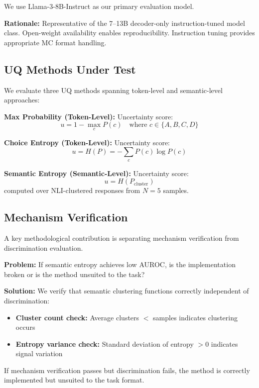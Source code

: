 We use Llama-3-8B-Instruct as our primary evaluation model.

\textbf{Rationale:} Representative of the 7--13B decoder-only instruction-tuned model class. Open-weight availability enables reproducibility. Instruction tuning provides appropriate MC format handling.

\subsection{UQ Methods Under Test}

We evaluate three UQ methods spanning token-level and semantic-level approaches:

\textbf{Max Probability (Token-Level):} Uncertainty score:
\begin{equation}
u = 1 - \max_c P(c) \quad \text{where } c \in \{A, B, C, D\}
\end{equation}

\textbf{Choice Entropy (Token-Level):} Uncertainty score:
\begin{equation}
u = H(P) = -\sum_c P(c) \log P(c)
\end{equation}

\textbf{Semantic Entropy (Semantic-Level):} Uncertainty score:
\begin{equation}
u = H(P_{\text{cluster}})
\end{equation}
computed over NLI-clustered responses from $N=5$ samples.

\subsection{Mechanism Verification}

A key methodological contribution is separating mechanism verification from discrimination evaluation.

\textbf{Problem:} If semantic entropy achieves low AUROC, is the implementation broken or is the method unsuited to the task?

\textbf{Solution:} We verify that semantic clustering functions correctly independent of discrimination:
\begin{itemize}
    \item \textbf{Cluster count check:} Average clusters $<$ samples indicates clustering occurs
    \item \textbf{Entropy variance check:} Standard deviation of entropy $> 0$ indicates signal variation
\end{itemize}

If mechanism verification passes but discrimination fails, the method is correctly implemented but unsuited to the task format.
